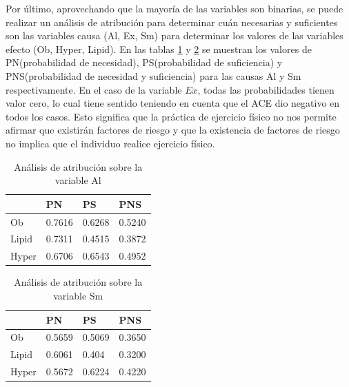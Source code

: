 Por último, aprovechando que la mayoría de las variables son binarias, se puede realizar un análisis de atribución para determinar cuán necesarias y suficientes son las variables causa (Al, Ex, Sm) para determinar los valores de las variables efecto (Ob, Hyper, Lipid). En las tablas \ref{table:attr-Al} y \ref{table:attr-Sm} se muestran los valores de PN(probabilidad de necesidad), PS(probabilidad de suficiencia) y PNS(probabilidad de necesidad y suficiencia) para las causas Al y Sm respectivamente. En el caso de la variable $Ex$, todas las probabilidades tienen valor cero, lo cual tiene sentido teniendo en cuenta que el ACE dio negativo en todos los casos. Esto significa que la práctica de ejercicio físico no nos permite afirmar que existirán factores de riesgo y que la existencia de factores de riesgo no implica que el individuo realice ejercicio físico. 

\begin{table}[h!]
	\centering
	\begin{tabular}{| m{1.2cm} | m{1.2cm} | m{1.2cm}| m{1.2cm} |}
		\hline
		& PN & PS & PNS \\
		\hline
		Ob & 0.7616 &  0.6268 & 0.5240 \\			
		\hline
		Lipid & 0.7311 & 0.4515 & 0.3872 \\
		\hline
		Hyper & 0.6706 & 0.6543 & 0.4952 \\
		\hline
	\end{tabular}
	\caption{Análisis de atribución sobre la variable Al}
	\label{table:attr-Al}
\end{table}

\begin{table}[h!]
	\centering
	\begin{tabular}{| m{1.2cm} | m{1.2cm} | m{1.2cm}| m{1.2cm} |}
		\hline
		& PN & PS & PNS \\
		\hline
		Ob & 0.5659 &  0.5069 & 0.3650 \\			
		\hline
		Lipid & 0.6061 & 0.404 & 0.3200 \\
		\hline
		Hyper & 0.5672 & 0.6224 & 0.4220 \\
		\hline
	\end{tabular}
	\caption{Análisis de atribución sobre la variable Sm}
	\label{table:attr-Sm}
\end{table}






